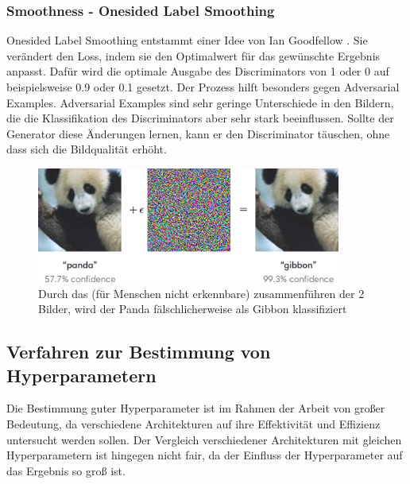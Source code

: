 \subsubsection{Smoothness - Onesided Label Smoothing}
Onesided Label Smoothing entstammt einer Idee von Ian Goodfellow \cite{ian-goodfellow-onesided-label-smoothing}.
Sie verändert den Loss, indem sie den Optimalwert für das gewünschte Ergebnis anpasst.
Dafür wird die optimale Ausgabe des Discriminators von 1 oder 0 auf beispielsweise 0.9 oder 0.1 gesetzt.
Der Prozess hilft besonders gegen Adversarial Examples.
Adversarial Examples sind sehr geringe Unterschiede in den Bildern, die die Klassifikation des Discriminators aber sehr stark beeinflussen.
Sollte der Generator diese Änderungen lernen, kann er den Discriminator täuschen, ohne dass sich die Bildqualität erhöht.

\begin{figure}[H]
	\centering
	\includegraphics[width=10cm]{kapitel/2_stand_der_technik/img/adversrial-example.png}
	\caption[Adversarial Example]{Durch das (für Menschen nicht erkennbare) zusammenführen der 2 Bilder, wird der Panda fälschlicherweise als Gibbon klassifiziert \cite{example-one-sided-label-smoothing}}
	\label{smoothness-adversarial-example}
\end{figure}


\subsection{Verfahren zur Bestimmung von Hyperparametern}
\label{chapter:verfahren-bestimmung-hyperparameter}

Die Bestimmung guter Hyperparameter ist im Rahmen der Arbeit von großer Bedeutung, da verschiedene Architekturen auf ihre Effektivität und Effizienz untersucht werden sollen.
Der Vergleich verschiedener Architekturen mit gleichen Hyperparametern ist hingegen nicht fair, da der Einfluss der Hyperparameter auf das Ergebnis so groß ist.
\newline

